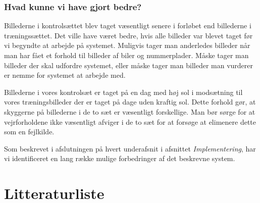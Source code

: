 \documentclass[11pt,a4paper,final]{article}
\begin{document}
\subsubsection*{Hvad kunne vi have gjort bedre?}
Billederne i kontrolsættet blev taget væsentligt senere i forløbet end billederne i træningssættet. Det ville have været bedre, hvis alle billeder var blevet taget før vi begyndte at arbejde på systemet. Muligvis tager man anderledes billeder når man har fået et forhold til billeder af biler og nummerplader. Måske tager man billeder der skal udfordre systemet, eller måske tager man billeder man vurderer er nemme for systemet at arbejde med.

Billederne i vores kontrolsæt er taget på en dag med høj sol i modsætning til vores træningsbilleder der er taget på dage uden kraftig sol. Dette forhold gør, at skyggerne på billederne i de to sæt er væsentligt forskellige. Man bør sørge for at vejrforholdene ikke væsentligt afviger i de to sæt for at forsøge at elimenere dette som en fejlkilde.

Som beskrevet i afslutningen på hvert underafsnit i afsnittet \textit{Implementering}, har vi identificeret en lang række mulige forbedringer af det beskrevne system. 




\newpage %
\section{Litteraturliste}
\end{document}
